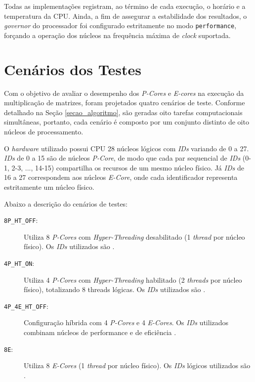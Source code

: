 \documentclass[acmsmall]{acmart}
\begin{document}
Todas as implementações registram, ao término de cada execução, o horário e a temperatura da CPU. Ainda, a fim de assegurar a estabilidade dos resultados, o \textit{governor} do processador foi configurado estritamente no modo \texttt{performance}, forçando a operação dos núcleos na frequência máxima de \textit{clock} suportada.

\section{Cenários dos Testes}
Com o objetivo de avaliar o desempenho dos \textit{P-Cores} e \textit{E-cores} na execução da multiplicação de matrizes, foram projetados quatro cenários de teste. Conforme detalhado na Seção \ref{secao_algoritmo}, são geradas oito tarefas computacionais simultâneas, portanto, cada cenário é composto por um conjunto distinto de oito núcleos de processamento.

O \textit{hardware} utilizado possui CPU 28 núcleos lógicos com \textit{IDs} variando de 0 a 27.  \textit{IDs} de 0 a 15 são de núcleos  \textit{P-Core}, de modo que cada par sequencial de  \textit{IDs} (0-1, 2-3, ..., 14-15) compartilha os recursos de um mesmo núcleo físico. Já  \textit{IDs} de 16 a 27 correspondem aos núcleos  \textit{E-Core}, onde cada identificador representa estritamente um núcleo físico.

Abaixo a descrição do cenários de testes:

\begin{description}
	\item[\texttt{8P\_HT\_OFF}:] Utiliza 8 \textit{P-Cores} com \textit{Hyper-Threading} desabilitado (1 \textit{thread} por núcleo físico). Os \textit{IDs} utilizados são .
	
	\item[\texttt{4P\_HT\_ON}:] Utiliza 4 \textit{P-Cores} com \textit{Hyper-Threading} habilitado (2 \textit{threads} por núcleo físico), totalizando 8 threads lógicas. Os \textit{IDs} utilizados são .
	
	\item[\texttt{4P\_4E\_HT\_OFF}:] Configuração híbrida com 4 \textit{P-Cores} e 4 \textit{E-Cores}. Os \textit{IDs} utilizados combinam núcleos de performance  e de eficiência .
	
	\item[\texttt{8E}:] Utiliza 8 \textit{E-Cores} (1 \textit{thread} por núcleo físico). Os \textit{IDs} lógicos utilizados são .
\end{description}
\end{document}
